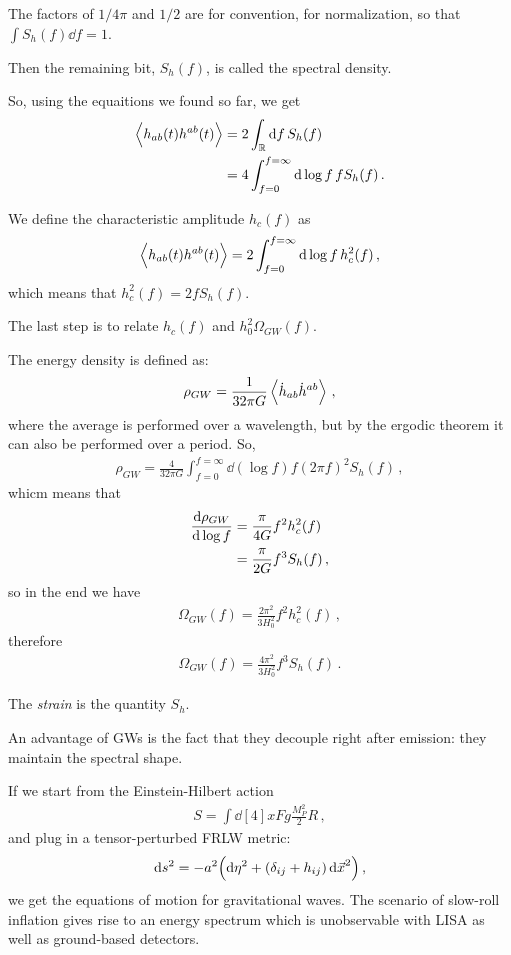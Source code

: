 \documentclass[main.tex]{subfiles}
\begin{document}
The factors of \(1 / 4 \pi \) and \(1 / 2\) are for convention, for normalization, so that \(\int S_{h} (f) \dd{f} = 1\). 

Then the remaining bit, \(S_{h}(f)\), is called the spectral density. 

So, using the equaitions we found so far, we get 
%
\begin{align}
\expval{h_{ab}(t) h^{ab}(t)} &= 2 \int_{\mathbb{R}} \dd{f} S_h (f)  \\
&= 4 \int_{f=0}^{f= \infty } \dd{\log f} f S_h (f)
\,.
\end{align}

We define the characteristic amplitude \(h_{c}(f)\) as 
%
\begin{align}
\expval{h_{ab} (t) h^{ab } (t)} = 2 \int_{f=0}^{f = \infty} \dd{\log f} h_c^2 (f)
\,,
\end{align}
%
which means that \(h_c^2(f) = 2 f S_h(f)\). 

The last step is to relate \(h_c(f)\) and \(h_0^2 \Omega_{GW}(f)\). 

The energy density is defined as:
%
\begin{align}
\rho_{GW} =  \frac{1}{32 \pi G} \expval{\dot{h}_{ab} \dot{h}^{ab} }
\,,
\end{align}
%
where the average is performed over a wavelength, but by the ergodic theorem it can also be performed over a period.
So, 
%
\begin{align}
\rho_{GW} = \frac{4}{32 \pi G} \int_{f=0}^{f= \infty } \dd{(\log f)} f (2 \pi f)^2 S_h (f)
\,,
\end{align}
%
whicm means that 
%
\begin{align}
\dv{\rho_{GW}}{\log f} &= \frac{\pi }{4 G} f^2 h_c^2(f)  \\
&= \frac{\pi}{2G} f^3 S_h (f)
\,,
\end{align}
%
so in the end we have 
%
\begin{align}
\Omega_{GW} (f) = \frac{2 \pi^2}{3 H_0^2} f^2 h_c^2 (f)
\,,
\end{align}
%
therefore 
%
\begin{align}
\Omega_{GW}(f) = \frac{4 \pi^2}{3 H_0^2} f^3 S_h (f)
\,.
\end{align}

The \emph{strain} is the quantity \(S_h\). 

An advantage of GWs is the fact that they decouple right after emission: they maintain the spectral shape. 

If we start from the Einstein-Hilbert action 
%
\begin{align}
S = \int \dd[4]{x} F g \frac{M_P^2}{2} R
\,,
\end{align}
%
and plug in a tensor-perturbed FRLW metric: 
%
\begin{align}
\dd{s^2} = - a^2 \qty(\dd{\eta^2  } + (\delta_{ij} + h_{ij}) \dd{\vec{x}}^2)
\,,
\end{align}
%
we get the equations of motion for gravitational waves. 
The scenario of slow-roll inflation gives rise to an energy spectrum which is unobservable with LISA as well as ground-based detectors. 
\end{document}
